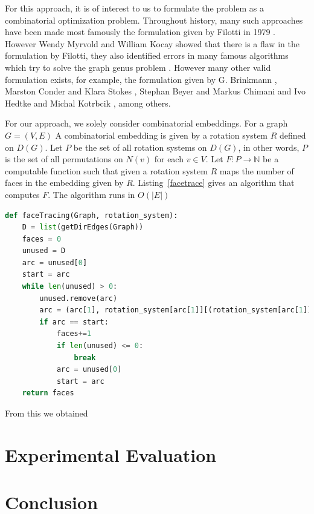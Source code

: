 \documentclass{article}
\newcommand{\classX}[1]{\ensuremath{\text{\textsf{\textbf{#1}}}}}
\newcommand{\classP}{\classX{P}}
\newcommand{\classNP}{\classX{NP}}
\begin{document}
    For this approach, it is of interest to us to formulate the problem as a combinatorial optimization problem. 
    Throughout history, many such approaches have been made most famously the formulation given by Filotti in 1979 \cite{Filotti79}. However Wendy Myrvold and William Kocay showed that there is a flaw in the formulation by Filotti, they also identified errors in many famous algorithms which try to solve the graph genus problem \cite{Myrvold11}.
    However many other valid formulation exists, for example, the formulation given by G. Brinkmann \cite{brinkmann20}, Marston Conder and Klara Stokes \cite{Conder19}, Stephan Beyer and Markus Chimani and Ivo Hedtke and Michal Kotrbcik \cite{Beyer16}, among others.
    
    For our approach, we solely consider combinatorial embeddings. For a graph $G = (V, E)$
    A combinatorial embedding is given by a rotation system $R$ defined on $D(G)$. Let $P$ be the set of all rotation systems on $D(G)$, in other words, $P$ is the set of all permutations on $N(v)$ for each $v\in V$.
    Let $F: P \to \mathbb{N}$ be a computable function such that given a rotation system $R$ maps the number of faces in the embedding given by $R$. Listing~\ref{facetrace} gives an algorithm that computes $F$. The algorithm runs in $O(|E|)$

\begin{lstlisting}[language=Python, caption = Facetracing Algorithm, label= facetrace]
    def faceTracing(Graph, rotation_system):
    D = list(getDirEdges(Graph))
    faces = 0 
    unused = D
    arc = unused[0]
    start = arc
    while len(unused) > 0:
        unused.remove(arc)
        arc = (arc[1], rotation_system[arc[1]][(rotation_system[arc[1]].index(arc[0]) + 1)%len(rotation_system[arc[1]])])
        if arc == start:
            faces+=1
            if len(unused) <= 0:
                break
            arc = unused[0]
            start = arc
    return faces
\end{lstlisting}
From this we obtained

\section{Experimental Evaluation}\label{sec: exp}

\section{Conclusion}\label{sec: con}


    
\end{document}
